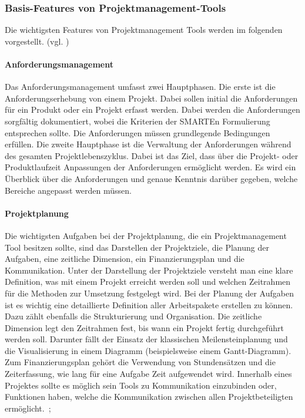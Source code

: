 \documentclass[sigconf, nonacm]{acmart}
\begin{document}
\subsubsection{Basis-Features von Projektmanagement-Tools}
Die wichtigsten Features von Projektmanagement Tools werden im folgenden vorgestellt. (vgl. \cite{noauthor_projektmanagement_nodate})

\paragraph{Anforderungsmanagement}
Das Anforderungsmanagement umfasst zwei Hauptphasen. Die erste ist die Anforderungserhebung von einem Projekt. Dabei sollen initial die Anforderungen für ein Produkt oder ein Projekt erfasst werden. Dabei werden die Anforderungen sorgfältig dokumentiert, wobei die Kriterien der SMARTEn Formulierung entsprechen sollte. Die Anforderungen müssen grundlegende Bedingungen erfüllen.
Die zweite Hauptphase ist die Verwaltung der Anforderungen während des gesamten Projektlebenszyklus.
Dabei ist das Ziel, dass über die Projekt- oder Produktlaufzeit Anpassungen der Anforderungen ermöglicht werden. Es wird ein Überblick über die Anforderungen und genaue Kenntnis darüber gegeben, welche Bereiche angepasst werden müssen. ~\citep{venzmer_anforderungsmanagement-tool_2020}

\paragraph{Projektplanung}
Die wichtigsten Aufgaben bei der Projektplanung, die ein Projektmanagement Tool besitzen sollte, sind das Darstellen der Projektziele, die Planung der Aufgaben, eine zeitliche Dimension, ein Finanzierungsplan und die Kommunikation. Unter der Darstellung der Projektziele versteht man eine klare Definition, was mit einem Projekt erreicht werden soll und welchen Zeitrahmen für die Methoden zur Umsetzung festgelegt wird. Bei der Planung der Aufgaben ist es wichtig eine detaillierte Definition aller Arbeitspakete erstellen zu können. Dazu zählt ebenfalls die Strukturierung und Organisation. Die zeitliche Dimension legt den Zeitrahmen fest, bis wann ein Projekt fertig durchgeführt werden soll. Darunter fällt der Einsatz der klassischen Meilensteinplanung und die Visualisierung in einem Diagramm (beispielsweise einem Gantt-Diagramm). Zum Finanzierungsplan gehört die Verwendung von Stundensätzen und die Zeiterfassung, wie lang für eine Aufgabe Zeit aufgewendet wird. Innerhalb eines Projektes sollte es möglich sein Tools zu Kommunikation einzubinden oder, Funktionen haben, welche die Kommunikation zwischen allen Projektbeteiligten ermöglicht.~\citep{venzmer_projektplaner-software_2020};
\end{document}

